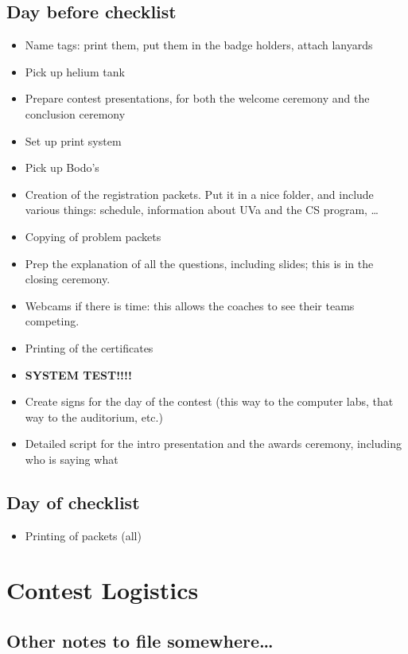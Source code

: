 \documentclass[11pt,twoside,letterpaper]{book}
\newenvironment{itemlist}{
\begin{itemize}
\setlength{\itemsep}{0pt}
\setlength{\parskip}{0pt}}
{\end{itemize}}
\begin{document}
\section{Day before checklist}

\begin{itemlist}
\item Name tags: print them, put them in the badge holders, attach
  lanyards
\item Pick up helium tank
\item Prepare contest presentations, for both the welcome ceremony and
  the conclusion ceremony
\item Set up print system
\item Pick up Bodo's
\item Creation of the registration packets. Put it in a nice folder,
  and include various things: schedule, information about UVa and the
  CS program, \ldots
\item Copying of problem packets
\item Prep the explanation of all the questions, including slides;
  this is in the closing ceremony.
\item Webcams if there is time: this allows the coaches to see their
  teams competing.
\item Printing of the certificates
\item {\bf SYSTEM TEST!!!!}
\item Create signs for the day of the contest (this way to the
  computer labs, that way to the auditorium, etc.)
\item Detailed script for the intro presentation and the awards
  ceremony, including who is saying what
\end{itemlist}  

\section{Day of checklist}

\begin{itemlist}
\item Printing of packets (all)
\end{itemlist}

\chapter{Contest Logistics}

\section{Other notes to file somewhere\ldots}
\end{document}
